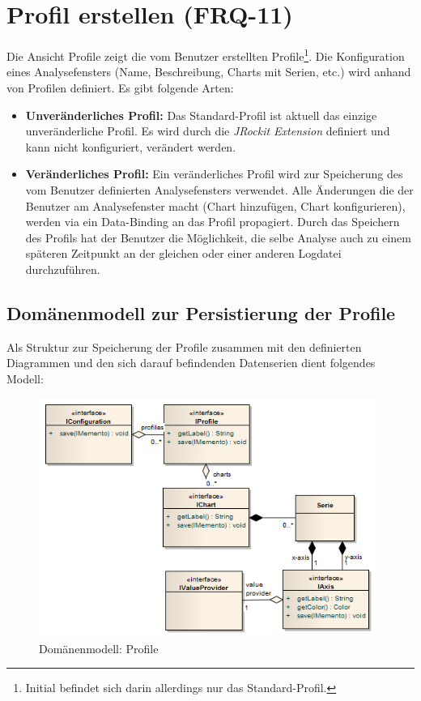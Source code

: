 \section{Profil erstellen (FRQ-11)}
Die Ansicht Profile zeigt die vom Benutzer erstellten Profile\footnote{Initial befindet sich darin allerdings nur das Standard-Profil.}. Die Konfiguration eines Analysefensters (Name, Beschreibung, Charts mit Serien, etc.) wird anhand von Profilen definiert. Es gibt folgende  Arten:
\begin{itemize}
	\item \textbf{Unveränderliches Profil:} Das Standard-Profil ist aktuell das einzige unveränderliche Profil. Es wird durch die \textit{JRockit Extension} definiert und kann nicht konfiguriert, verändert werden.
	\item \textbf{Veränderliches Profil:} Ein veränderliches Profil wird zur Speicherung des vom Benutzer definierten Analysefensters verwendet. Alle Änderungen die der Benutzer am Analysefenster macht (Chart hinzufügen, Chart konfigurieren), werden via ein Data-Binding an das Profil propagiert. Durch das Speichern des Profils hat der Benutzer die Möglichkeit, die selbe Analyse auch zu einem späteren Zeitpunkt an der gleichen oder einer anderen Logdatei durchzuführen.
\end{itemize}

\subsection{Domänenmodell zur Persistierung der Profile}
Als Struktur zur Speicherung der Profile zusammen mit den definierten Diagrammen und den sich darauf befindenden Datenserien dient folgendes Modell:
 \begin{figure}[H]
  	\centering
    	\includegraphics[width=11cm]{images/core_domain_profiles}
        	\caption{Domänenmodell: Profile}
\end{figure}

